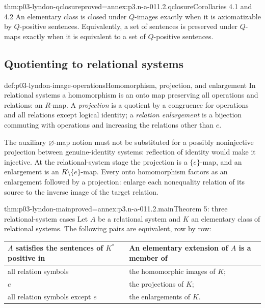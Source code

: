 \begin{hbcorollary}{thm:p03-lyndon-qclosure}{proved=annex:p3.n-a-011.2.qclosure}{Corollaries 4.1 and 4.2}
An elementary class is closed under \(Q\)-images exactly when it is
axiomatizable by \(Q\)-positive sentences. Equivalently, a set of
sentences is preserved under \(Q\)-maps exactly when it is equivalent
to a set of \(Q\)-positive sentences.
\end{hbcorollary}

\subsection{Quotienting to relational systems}

\begin{hbdefinition}{def:p03-lyndon-image-operations}{Homomorphism, projection, and enlargement}
In relational systems a homomorphism is an onto map preserving all
operations and relations: an \(R\)-map. A \emph{projection} is a
quotient by a congruence for operations and all relations except logical
identity; a \emph{relation enlargement} is a bijection commuting with
operations and increasing the relations other than \(e\).

The auxiliary \(\varnothing\)-map notion must not be substituted for
a possibly noninjective projection between genuine-identity systems:
reflection of identity would make it injective. At the relational-system
stage the projection is a \(\{e\}\)-map, and an enlargement is an
\(R\setminus\{e\}\)-map. Every onto homomorphism factors as an
enlargement followed by a projection: enlarge each nonequality relation
of its source to the inverse image of the target relation.
\end{hbdefinition}

\begin{hbtheorem}{thm:p03-lyndon-main}{proved=annex:p3.n-a-011.2.main}{Theorem 5: three relational-system cases}
Let \(A\) be a relational system and \(K\) an elementary class of
relational systems. The following pairs are equivalent, row by row:
\begin{center}
\begin{tabular}{p{}p{}}
\(A\) satisfies the sentences of \(K^*\) positive in &
An elementary extension of \(A\) is a member of \\
\hline
all relation symbols & the homomorphic images of \(K\);\\
\(e\) & the projections of \(K\);\\
all relation symbols except \(e\) & the enlargements of \(K\).
\end{tabular}
\end{center}
\end{hbtheorem}

